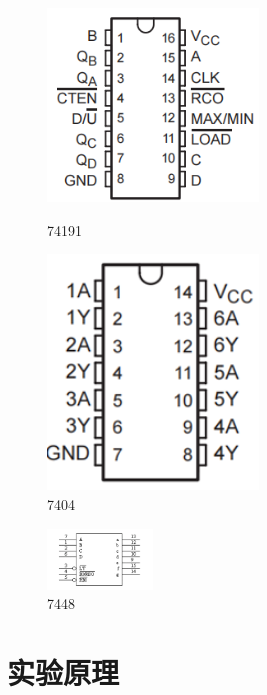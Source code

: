 \documentclass{ctexart}
\begin{document}
\begin{figure}[H]
    \centering
    \begin{minipage}{0.5\textwidth}
    \centering
           \includegraphics[width=0.5\textwidth]{74191.png}
           \caption{74191}
    \label{}
    \end{minipage}
    \hspace{0.05\textwidth}
    \begin{minipage}{0.4\textwidth}
    \centering
           \includegraphics[width=0.5\textwidth]{7404.png}
           \caption{7404}
    \label{7474}
    \end{minipage}
\end{figure}
\begin{figure}[H]
    \centering
    \includegraphics[width=0.25\textwidth]{7448.png}
    \caption{7448}
\end{figure}
\section{实验原理}
\end{document}
